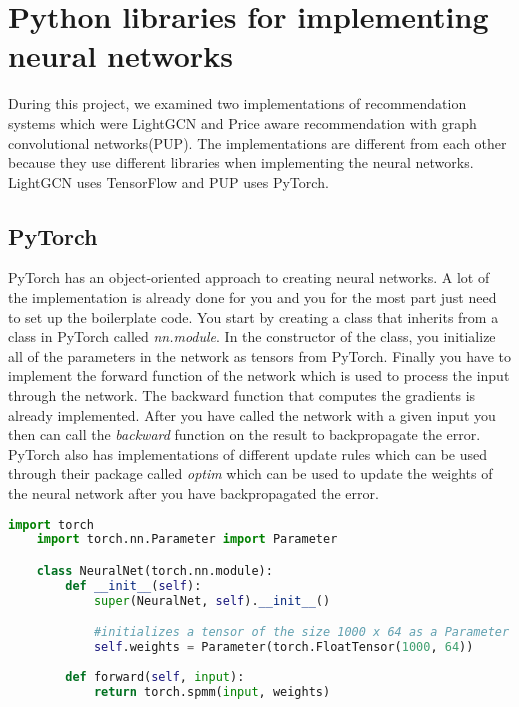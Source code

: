 \section{Python libraries for implementing neural networks}
During this project, we examined two implementations of recommendation systems which were LightGCN and Price aware recommendation with graph convolutional networks(PUP). 
The implementations are different from each other because they use different libraries when implementing the neural networks.
LightGCN uses TensorFlow and PUP uses PyTorch.

\subsection{PyTorch}
PyTorch has an object-oriented approach to creating neural networks.
A lot of the implementation is already done for you and you for the most part just need to set up the boilerplate code.
You start by creating a class that inherits from a class in PyTorch called \textit{nn.module}.
In the constructor of the class, you initialize all of the parameters in the network as tensors from PyTorch.
Finally you have to implement the forward function of the network which is used to process the input through the network.
The backward function that computes the gradients is already implemented.
After you have called the network with a given input you then can call the \textit{backward} function on the result to backpropagate the error.
PyTorch also has implementations of different update rules which can be used through their package called \textit{optim} which can be used to update the weights of the neural network after you have backpropagated the error.

\begin{lstlisting}[language=Python]
	import torch
	import torch.nn.Parameter import Parameter

	class NeuralNet(torch.nn.module):
		def __init__(self):
			super(NeuralNet, self).__init__()

			#initializes a tensor of the size 1000 x 64 as a Parameter in the neural network
			self.weights = Parameter(torch.FloatTensor(1000, 64))
		
		def forward(self, input):
			return torch.spmm(input, weights)

\end{lstlisting}

